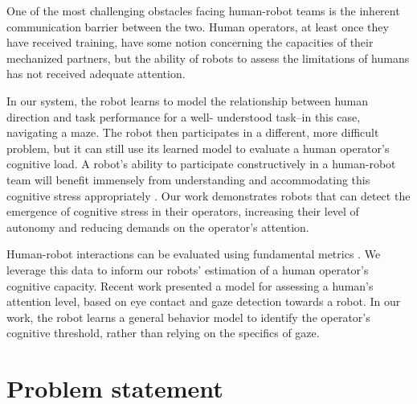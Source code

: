 \documentclass{sig-alternate}
\begin{document}
One of the most challenging obstacles facing human-robot teams is the inherent communication barrier between the two.
Human operators, at least once they have received training, have some notion concerning the capacities of their
mechanized partners, but the ability of robots to assess the limitations of humans has not received adequate attention.

In our system, the robot learns to model the relationship between human direction and task performance for a well-
understood task--in this case, navigating a maze. The robot then participates in a different, more difficult problem,
but it can still use its learned model to evaluate a human operator's cognitive load.  A robot's ability to participate
constructively in a human-robot team will benefit immensely from understanding and accommodating this cognitive stress
appropriately \cite{crandall2005validating}. Our work demonstrates robots that can detect the emergence of cognitive
stress in their operators, increasing their level of autonomy and reducing demands on the operator's attention.

Human-robot interactions can be evaluated using fundamental metrics \cite{olsen2003metrics}.  We leverage this data to
inform our robots' estimation of a human operator's cognitive capacity.  Recent work
\cite{das2013attention,Hoque:2012:ACH:2157689.2157729} presented a model for assessing a human's attention level, based
on eye contact and gaze detection towards a robot.  In our work, the robot learns a general behavior model to identify
the operator's cognitive threshold, rather than relying on the specifics of gaze.


\section{Problem statement}
\end{document}
